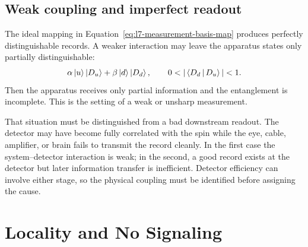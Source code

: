 \begin{classroomqa}
\end{classroomqa}

\subsection{Weak coupling and imperfect readout}

The ideal mapping in Equation~\eqref{eq:l7-measurement-basis-map} produces perfectly distinguishable records. A weaker interaction may leave the apparatus states only partially distinguishable:
\begin{equation}
\alpha\ket{u}\ket{D_u}
+\beta\ket{d}\ket{D_d},
\qquad
0<|\braket{D_d}{D_u}|<1.
\label{eq:l7-weak-measurement}
\end{equation}
Then the apparatus receives only partial information and the entanglement is incomplete. This is the setting of a weak or unsharp measurement.

That situation must be distinguished from a bad downstream readout. The detector may have become fully correlated with the spin while the eye, cable, amplifier, or brain fails to transmit the record cleanly. In the first case the system--detector interaction is weak; in the second, a good record exists at the detector but later information transfer is inefficient. Detector efficiency can involve either stage, so the physical coupling must be identified before assigning the cause.

\begin{classroomqa}
\end{classroomqa}

\section{Locality and No Signaling}

